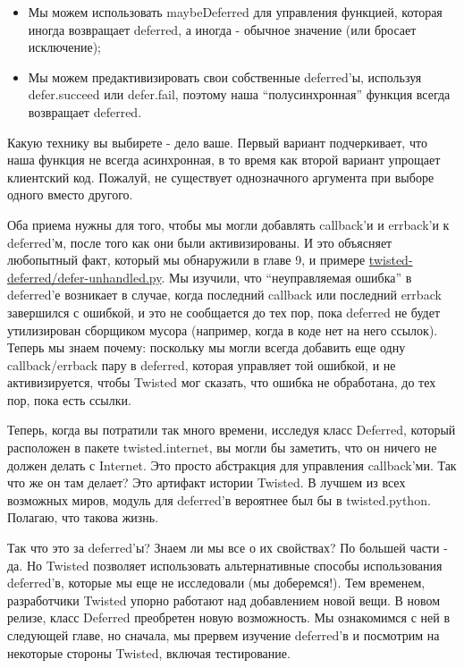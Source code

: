 \begin{itemize}

\item Мы можем использовать maybeDeferred для управления 
функцией, которая иногда возвращает deferred, а иногда - 
обычное значение (или бросает исключение);

\item Мы можем предактивизировать свои собственные 
deferred'ы, используя defer.succeed или defer.fail, 
поэтому наша ``полусинхронная'' функция всегда возвращает 
deferred.

\end{itemize}

Какую технику вы выбирете - дело ваше.
Первый вариант подчеркивает, что 
наша функция не всегда асинхронная, в то время 
как второй вариант упрощает клиентский код. 
Пожалуй, не существует однозначного аргумента 
при выборе одного вместо другого. 


Оба приема нужны для того, 
чтобы мы могли добавлять callback'и и errback'и к 
deferred'м, после того как они были активизированы. И 
это объясняет любопытный факт, который мы обнаружили 
в главе 9, и примере \href{http://github.com/jdavisp3/twisted-intro/blob/master/twisted-deferred/defer-unhandled.py#L1}{twisted-deferred/defer-unhandled.py}. Мы изучили, что 
``неуправляемая ошибка'' в deferred'е возникает в случае, когда последний  
callback или последний errback завершился с ошибкой, и это не сообщается 
до тех пор, пока deferred не будет утилизирован сборщиком мусора (например, 
когда в коде нет на него ссылок). 
Теперь мы знаем почему: поскольку мы могли всегда 
добавить еще одну callback/errback пару в deferred, 
которая управляет той ошибкой, и не активизируется, 
чтобы Twisted мог сказать, что ошибка не обработана, 
до тех пор, пока есть ссылки.


Теперь, когда вы потратили так много времени, исследуя 
класс Deferred, который расположен в пакете twisted.internet, 
вы могли бы заметить, что он ничего не должен делать с Internet. 
Это просто абстракция для управления callback'ми. Так что же он там 
делает? Это артифакт истории Twisted. В лучшем из всех 
возможных миров, модуль для deferred'в вероятнее был бы в twisted.python. 
Полагаю, что такова жизнь.  


Так что это за deferred'ы? Знаем ли мы все о их свойствах? 
По большей части - да. Но Twisted позволяет использовать 
альтернативные способы использования deferred'в, которые 
мы еще не исследовали (мы доберемся!). Тем временем, 
разработчики Twisted упорно работают над добавлением новой 
вещи. В новом релизе, класс Deferred преобретен новую 
возможность. Мы ознакомимся с ней в следующей главе, но 
сначала, мы прервем изучение deferred'в и посмотрим 
на некоторые стороны Twisted, включая тестирование.



